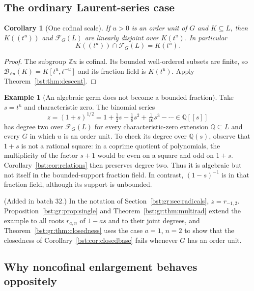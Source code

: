 \documentclass[11pt,letterpaper]{article}
\newtheorem{corollary}[theorem]{Corollary}
\theoremstyle{definition}
\newtheorem{example}[theorem]{Example}
\theoremstyle{remark}
\newcommand{\Q}{\mathbb Q}
\newcommand{\Z}{\mathbb Z}
\newcommand{\BB}[2]{\mathcal B_{#2}(#1)}
\newcommand{\FF}[2]{\mathcal F_{#2}(#1)}
\begin{document}
\subsection{The ordinary Laurent-series case}

\begin{corollary}[One cofinal scale]\label{bst:cor:onescale}
If $u>0$ is an order unit of $G$ and $K\subseteq L$, then
$K((t^u))$ and $\FF LG$ are linearly disjoint over $K(t^u)$. In particular
\[
 K((t^u))\cap\FF LG=K(t^u).
\]
\end{corollary}
\begin{proof}
The subgroup $\Z u$ is cofinal. Its bounded well-ordered subsets are finite,
so $\BB K{\Z u}=K[t^u,t^{-u}]$ and its fraction field is $K(t^u)$.
Apply Theorem~\ref{bst:thm:descent}.
\end{proof}

\begin{example}[An algebraic germ does not become a bounded fraction]
Take $s=t^u$ and characteristic zero. The binomial series
\[
 z=(1+s)^{1/2}=1+\tfrac12s-\tfrac18s^2+\tfrac1{16}s^3-\cdots
 \in\Q[[s]]
\]
has degree two over $\FF LG$ for every characteristic-zero extension
$\Q\subseteq L$ and every $G$ in which $u$ is an order unit.
To check its degree over $\Q(s)$, observe that $1+s$ is not a rational
square: in a coprime quotient of polynomials, the multiplicity of the
factor $s+1$ would be even on a square and odd on $1+s$. Corollary~\ref{bst:cor:relations}
then preserves degree two. Thus it is algebraic but not itself in the
bounded-support fraction field. In contrast, $(1-s)^{-1}$ is in that
fraction field, although its support is unbounded.
\end{example}

(Added in batch 32.) In the notation of Section~\ref{bst:gr:sec:radicals},
$z=r_{-1,2}$. Proposition~\ref{bst:gr:prop:single} and
Theorem~\ref{bst:gr:thm:multirad} extend the example to all roots
$r_{a,n}$ of $1-as$ and to their joint degrees, and
Theorem~\ref{bst:gr:thm:closedness} uses the case $a=1$, $n=2$ to show that
the closedness of Corollary~\ref{bst:cor:closedbase} fails whenever $G$ has an
order unit.

\subsection{Why noncofinal enlargement behaves oppositely}
\end{document}

